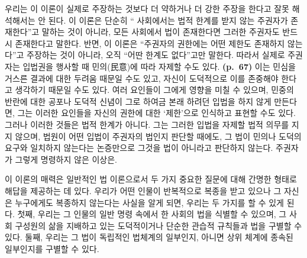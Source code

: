 우리는 이 이론이 실제로 주장하는 것보다 더 약하거나 더 강한 주장을
한다고 잘못 해석해서는 안 된다. 이 이론은 단순히 ``
사회에서는 법적 한계를 받지 않는 주권자가 존재한다''고 말하는 것이
아니라, 모든 사회에서 법이 존재한다면 그러한 주권자도 반드시 존재한다고
말한다. 반면, 이 이론은 ``주권자의 권한에는 어떤 제한도 존재하지
않는다''고 주장하는 것이 아니라, 오직 ``어딴  한계도
없다''고만 말한다. 따라서 실제로 주권자는 입법권을 행사할 때
민의(民意)에 따라 자제할 수도 있다. \textbf{(p.~67)} 이는 민심을 거스른
결과에 대한 두려움 때문일 수도 있고, 자신이 도덕적으로 이를 존중해야
한다고 생각하기 때문일 수도 있다. 여러 요인들이 그에게 영향을 미칠 수
있으며, 민중의 반란에 대한 공포나 도덕적 신념이 그로 하여금 본래 하려던
입법을 하지 않게 만든다면, 그는 이러한 요인들을 자신의 권한에 대한
`제한'으로 인식하고 표현할 수도 있다. 그러나 이러한 것들은 법적 한계가
아니다. 그는 그러한 입법을 자제할 법적 의무를 지지 않으며, 법원이 어떤
입법이 주권자의 법인지 판단할 때에도, 그 법이 민의나 도덕의 요구와
일치하지 않는다는 논증만으로 그것을 법이 아니라고 판단하지 않는다.
주권자가 그렇게 명령하지 않은 이상은.

이 이론의 매력은 일반적인 법 이론으로서 두 가지 중요한 질문에 대해
간명한 형태로 해답을 제공하는 데 있다. 우리가 어떤 인물이 반복적으로
복종을 받고 있으나 그 자신은 누구에게도 복종하지 않는다는 사실을 알게
되면, 우리는 두 가지를 할 수 있게 된다. 첫째, 우리는 그 인물의 일반 명령
속에서 한 사회의 법을 식별할 수 있으며, 그 사회 구성원의 삶을 지배하고
있는 도덕적이거나 단순한 관습적 규칙들과 법을 구별할 수 있다. 둘째,
우리는 그 법이 독립적인 법체계의 일부인지, 아니면 상위 체계에 종속된
일부인지를 구별할 수 있다.

